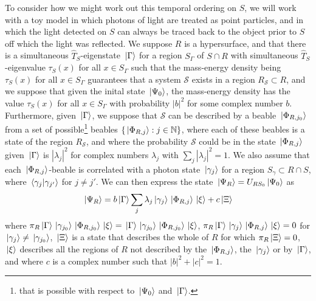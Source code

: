 To consider how we might work out this temporal ordering on $S$, we will work with a toy model in which photons of light are treated as point particles, and in which the light detected on $S$ can always be traced back to the object prior to $S$ off which the light was reflected. We suppose $R$ is a hypersurface, and that there is a simultaneous $\hat{T}_S$-eigenstate $\ket*{\Gamma}$ for a region $S_{\Gamma}$ of $S\cap R$ with simultaneous $\hat{T}_S$-eigenvalue $\tau_S(x)$ for all $x\in S_{\Gamma}$ such that the mass-energy density being $\tau_S(x)$ for all $x\in S_\Gamma$ guarantees that a system $\mathcal{S}$ exists in a region $R_{\mathcal{S}}\subset R$, and we suppose that given the inital state $\ket*{\Psi_0}$, the mass-energy density has the value $\tau_S(x)$ for all $x\in S_\Gamma$ with probability $|b|^2$ for some complex number $b$. Furthermore, given $\ket*{\Gamma}$, we suppose that  $\mathcal{S}$ can be described by a beable $\ket*{\Phi_{R, j_0}}$ from a set of possible\footnote{that is possible with respect to $\ket*{\Psi_0}$ and $\ket*{\Gamma}$.} beables $\{ \ket*{\Phi_{R, j}}: j\in \mathbb{N}\}$, where each of these beables is a state of the region $R_{\mathcal{S}}$, and where the probability $\mathcal{S}$ could be in the state $\ket*{\Phi_{R, j}}$ given $\ket*{\Gamma}$ is $|\lambda_j|^2$ for complex numbers $\lambda_j$ with $\sum_j|\lambda_j|^2=1$. We also assume that each $\ket*{\Phi_{R, j}}$-beable is correlated with a photon state $\ket*{\gamma_{j}}$ for a region $S_{\gamma}\subset R\cap S$, where $\ip*{\gamma_{j}}{\gamma_{j'}}$ for $j\neq j'$. We can then express the state $\ket*{\Psi_R}=U_{RS_0}\ket*{\Psi_0}$ as 
\begin{equation}
\ket*{\Psi_R}=b\ket*{\Gamma}\sum_j \lambda_j \ket*{\gamma_{j}}\ket*{\Phi_{R, j}}\ket*{\xi}+c\ket*{\Xi}
\end{equation}
where $\pi_R\ket*{\Gamma}\ket*{\gamma_{j_0}}\ket*{\Phi_{R,j_0}}\ket*{\xi}=\ket*{\Gamma}\ket*{\gamma_{j_0}}\ket*{\Phi_{R,j_0}}\ket*{\xi}$,  
$\pi_R\ket*{\Gamma}\ket*{\gamma_{j}}\ket*{\Phi_{R,j}}\ket*{\xi}=0$
for $\ket*{\gamma_{j}}\neq \ket*{\gamma_{j_0}}$, 
$\ket*{\Xi}$ is  a state that describes the whole of $R$ for which $\pi_R\ket*{\Xi}=0$, $\ket*{\xi}$ describes all the regions of $R$ not described by the $\ket*{\Phi_{R,j}}$, the $\ket*{\gamma_{j}}$ or by $\ket*{\Gamma}$, and where $c$ is a complex number such that $|b|^2+|c|^2=1$.

